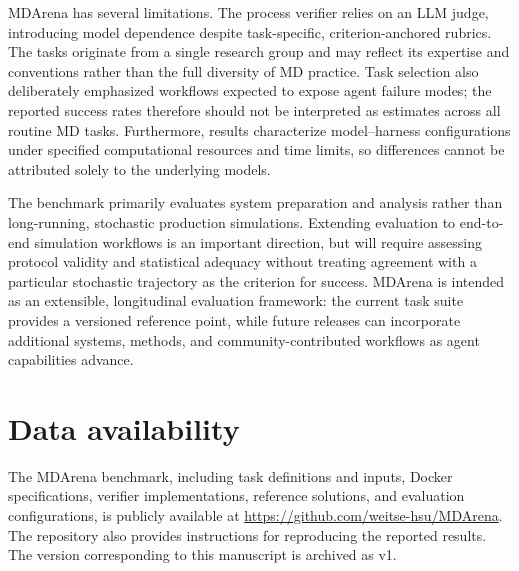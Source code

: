 MDArena has several limitations. The process verifier relies on an LLM judge, introducing model dependence despite task-specific, criterion-anchored rubrics. The tasks originate from a single research group and may reflect its expertise and conventions rather than the full diversity of MD practice. Task selection also deliberately emphasized workflows expected to expose agent failure modes; the reported success rates therefore should not be interpreted as estimates across all routine MD tasks. Furthermore, results characterize model–harness configurations under specified computational resources and time limits, so differences cannot be attributed solely to the underlying models.

The benchmark primarily evaluates system preparation and analysis rather than long-running, stochastic production simulations. Extending evaluation to end-to-end simulation workflows is an important direction, but will require assessing protocol validity and statistical adequacy without treating agreement with a particular stochastic trajectory as the criterion for success. MDArena is intended as an extensible, longitudinal evaluation framework: the current task suite provides a versioned reference point, while future releases can incorporate additional systems, methods, and community-contributed workflows as agent capabilities advance.


\section*{Data availability}


The MDArena benchmark, including task definitions and inputs, Docker specifications, verifier implementations, reference solutions, and evaluation configurations, is publicly available at
\url{https://github.com/weitse-hsu/MDArena}. The repository also provides instructions for reproducing
the reported results. The version corresponding to this manuscript is archived as v1.
